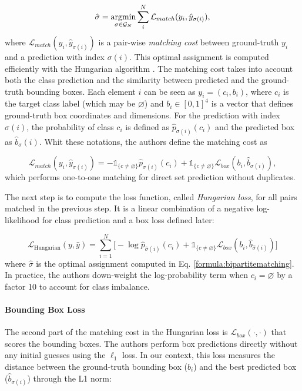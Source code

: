 \begin{equation}
\label{formula:bipartitematching}
\hat \sigma = \operatorname*{argmin}_{\sigma \in \mathcal{G}_N} \sum_{i}^{N} \mathcal{L}_{match}(y_i, \hat y_{\sigma(i)}),
\end{equation}
where $\mathcal{L}_{match}(y_i, \hat y_{\sigma(i)})$ is a pair-wise \textit{matching cost} between  ground-truth $y_i$ and a prediction with index $\sigma(i)$. This optimal assignment is computed efficiently
with the Hungarian algorithm \cite{hungarian}. The matching cost takes into account both the class prediction and the similarity between predicted and the ground-truth bounding boxes. Each element $i$ can be seen as $y_i = (c_i
, b_i)$, where $c_i$
is the target class label (which may be $\varnothing$) and $b_i \in [0, 1]^{4}$
is a vector that defines ground-truth box coordinates and dimensions. For the
prediction with index $\sigma(i)$, the probability of class $c_i$ is defined as $ \hat p_{\sigma(i)}(c_i)$ and
the predicted box as $\hat b_\sigma(i)$. Whit these notations, the authors define the matching cost as

\begin{equation}
	\mathcal{L}_{match}(y_i, \hat y_{\sigma(i)}) = -\mathds{1}_{\{c \neq \varnothing\}}\hat p_{\sigma(i)}(c_i) + \mathds{1}_{\{c \neq \varnothing\}}\mathcal{L}_{box}(b_i, \hat b_{\sigma(i)}),
\end{equation}
which performs one-to-one matching for direct set prediction without duplicates. 

The next step is to compute the loss function, called \textit{Hungarian loss}, for all pairs matched in the previous step. It is a linear combination of a negative log-likelihood for class prediction and a box loss defined later:

\begin{equation}
\mathcal{L}_{\text{Hungarian}}(y, \hat y) = \sum_{i = 1}^{N} \bigg [-\log \hat p_{\hat\sigma(i)}(c_i) + \mathds{1}_{\{c \neq \varnothing\}}\mathcal{L}_{box}(b_i, \hat b_{\hat\sigma(i)}) \bigg ]
\end{equation}
where $\hat \sigma$ is the optimal assignment computed in Eq. \ref{formula:bipartitematching}. In practice, the authors
down-weight the log-probability term when $c_i = \varnothing$ by a factor 10 to account for class imbalance. 

\paragraph{Bounding Box Loss} The second part of the matching cost in the Hungarian loss is $\mathcal{L}_{box}(\cdot, \cdot)$ that scores the bounding boxes. The authors perform box predictions directly without any initial guesses using the $\ell_1$ loss. In our context, this loss measures the distance between the  ground-truth bounding box ($b_i$) and the best predicted box ($\hat b_{\sigma(i)}$) through the L1 norm:

